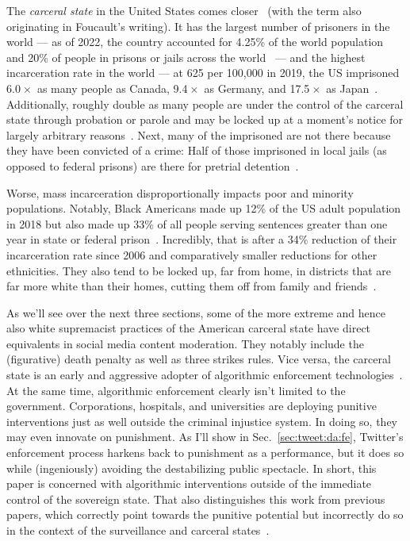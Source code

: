 The \emph{carceral state} in the United States comes closer~\cite{Simon2007}
(with the term also originating in Foucault's writing). It has the largest
number of prisoners in the world — as of 2022, the country accounted for 4.25\%
of the world population~\cite{Worldometer2023} and 20\% of people in prisons or
jails across the world~\cite{SawyerWagner2022} — and the highest incarceration
rate in the world — at 625 per 100,000 in 2019, the US imprisoned
6.0$\mspace{1mu}\times$ as many people as Canada, 9.4$\mspace{1mu}\times$ as
Germany, and 17.5$\mspace{1mu}\times$ as Japan~\cite{WorldPrisonBrief2023}.
Additionally, roughly double as many people are under the control of the
carceral state through probation or parole and may be locked up at a moment's
notice for largely arbitrary reasons~\cite{SawyerWagner2022}. Next, many of the
imprisoned are not there because they have been convicted of a crime: Half of
those imprisoned in local jails (as opposed to federal prisons) are there for
pretrial detention~\cite{SawyerWagner2022}.

Worse, mass incarceration disproportionally impacts poor and minority
populations. Notably, Black Americans made up 12\% of the US adult population in
2018 but also made up 33\% of all people serving sentences greater than one year
in state or federal prison~\cite{Gramlich2020}. Incredibly, that is after a 34\%
reduction of their incarceration rate since 2006 and comparatively smaller
reductions for other ethnicities. They also tend to be locked up, far from home,
in districts that are far more white than their homes, cutting them off from
family and friends~\cite{WagnerKopf2015}.

As we'll see over the next three sections, some of the more extreme and hence
also white supremacist practices of the American carceral state have direct
equivalents in social media content moderation. They notably include the
(figurative) death penalty as well as three strikes rules. Vice versa, the
carceral state is an early and aggressive adopter of algorithmic enforcement
technologies~\cite{AngwinLarsonea2016,EPIC2020,Hao2019,ReddenODonovanDixea2020,Yampolskiy2016}.
At the same time, algorithmic enforcement clearly isn't limited to the
government. Corporations, hospitals, and universities are deploying punitive
interventions just as well outside the criminal injustice system. In doing so,
they may even innovate on punishment. As I'll show in
Sec.~\ref{sec:tweet:da:fe}, Twitter's enforcement process harkens back to
punishment as a performance, but it does so while (ingeniously) avoiding the
destabilizing public spectacle. In short, this paper is concerned with
algorithmic interventions outside of the immediate control of the sovereign
state. That also distinguishes this work from previous papers, which correctly
point towards the punitive potential but incorrectly do so in the context of the
surveillance and carceral
states~\cite{DehlendorfGerety2021,McElroyWhittakerea2021}.


